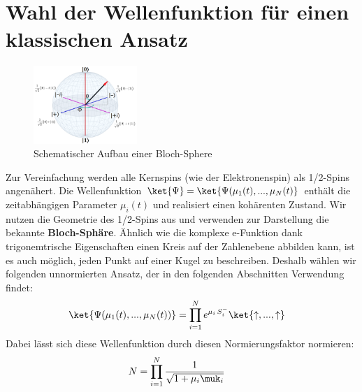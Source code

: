 \section{Wahl der Wellenfunktion für einen klassischen Ansatz}
\begin{figure}
    \centering
    \includegraphics[width = 0.35\textwidth]{Abbildungen/bloch-sphere.png}
    \caption{Schematischer Aufbau einer Bloch-Sphere}
    \label{fig:qubit}
\end{figure}
Zur Vereinfachung werden alle Kernspins (wie der Elektronenspin) als 1/2-Spins angenähert. 
Die Wellenfunktion $\ket{\Psi}=\ket{\Psi(\mu_1(t),...,\mu_N(t)}$ enthält die zeitabhängigen Parameter $\mu_i(t)$ und realisiert einen 
kohärenten Zustand. Wir nutzen die Geometrie des 1/2-Spins aus und verwenden zur Darstellung die bekannte \textbf{Bloch-Sphäre}. 
Ähnlich wie die komplexe e-Funktion dank trigonemtrische Eigenschaften einen Kreis auf der Zahlenebene abbilden kann, ist es auch möglich,
jeden Punkt auf einer Kugel zu beschreiben. Deshalb wählen wir folgenden unnormierten Ansatz, der in den folgenden Abschnitten Verwendung 
findet:
\begin{align}\label{klassischer_Ansatz}
    \ket{\Psi(\mu_1(t),...,\mu_N(t))} &= \prod_{i=1}^{N} e^{\mu_i\thinspace S_i^-}\ket{\uparrow,...,\uparrow}
\end{align}
Dabei lässt sich diese Wellenfunktion durch diesen Normierungsfaktor normieren:
\begin{align}
    N &= \prod_{i=1}^{N} \frac{1}{\sqrt{1+\mu_i\muk_i}}
\end{align}
